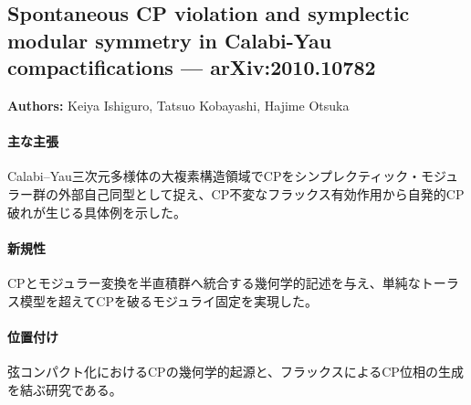 \subsection{Spontaneous CP violation and symplectic modular symmetry in Calabi-Yau compactifications --- arXiv:2010.10782}

\textbf{Authors:} Keiya Ishiguro, Tatsuo Kobayashi, Hajime Otsuka

\paragraph{主な主張}
Calabi--Yau三次元多様体の大複素構造領域でCPをシンプレクティック・モジュラー群の外部自己同型として捉え、CP不変なフラックス有効作用から自発的CP破れが生じる具体例を示した。 \cite{Ishiguro:2020nuf}

\paragraph{新規性}
CPとモジュラー変換を半直積群へ統合する幾何学的記述を与え、単純なトーラス模型を超えてCPを破るモジュライ固定を実現した。

\paragraph{位置付け}
弦コンパクト化におけるCPの幾何学的起源と、フラックスによるCP位相の生成を結ぶ研究である。
